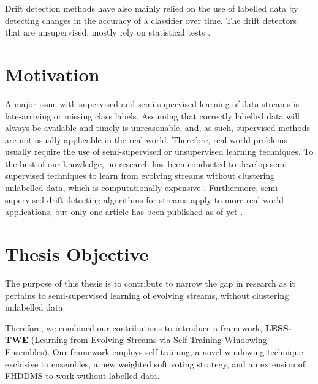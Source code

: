 Drift detection methods have also mainly relied on the use of labelled data by detecting changes in the accuracy of a classifier over time. The drift detectors that are unsupervised, mostly rely on statistical tests \cite{dries2009adaptive, friedman1979multivariate, sheskin2003handbook, sobolewski2013concept}.



\section{Motivation}
A major issue with supervised and semi-supervised learning of data streams is late-arriving or missing class labels.  Assuming that correctly labelled data will always be available and timely is unreasonable, and, as such, supervised methods are not usually applicable in the real world. Therefore, real-world problems usually require the use of semi-supervised or unsupervised learning techniques. To the best of our knowledge, no research has been conducted to develop semi-supervised techniques to learn from evolving streams without clustering unlabelled data, which is computationally expensive \cite{krempl2014open}. Furthermore, semi-supervised drift detecting algorithms for streams apply to more real-world applications, but only one article has been published as of yet \cite{haque2015sand}.

\section{Thesis Objective}
The purpose of this thesis is to contribute to narrow the gap in research as it pertains to semi-supervised learning of evolving streams, without clustering unlabelled data.

Therefore, we combined our contributions to introduce a framework, \textbf{LESS-TWE} (Learning from Evolving Streams via Self-Training Windowing Ensembles). Our framework employs self-training, a novel windowing technique exclusive to ensembles, a new weighted soft voting strategy, and an extension of FHDDMS to work without labelled data.

